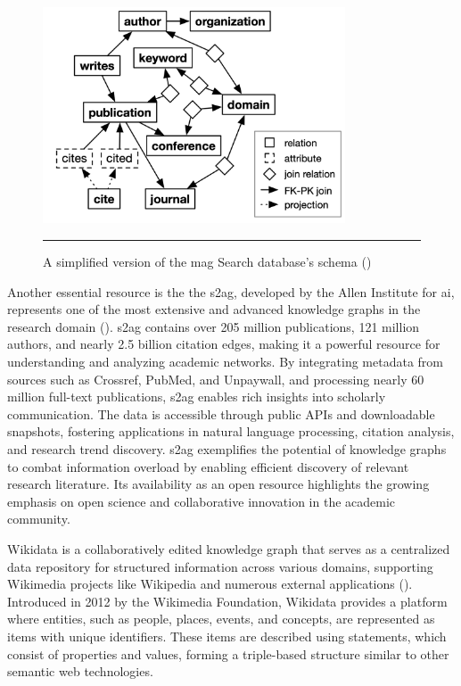 \begin{figure}[htbp]
    \centering
 \includegraphics[width=0.8\textwidth]{03_Figures/literature-review/mag-schema.png}
     \rule{35em}{0.5pt}
    \caption{A simplified version of the \gls{mag} Search database's schema (\cite{Baik2019})} 
 \label{fig:mag-schema}
\end{figure}

Another essential resource is the the \gls{s2ag}, developed by the Allen Institute for \acrlong{ai}, represents one of the most extensive and advanced knowledge graphs in the research domain (\cite{S2AG}).
\gls{s2ag} contains over 205 million publications, 121 million authors, and nearly 2.5 billion citation edges, making it a powerful resource for understanding and analyzing academic networks.
By integrating metadata from sources such as Crossref, PubMed, and Unpaywall, and processing nearly 60 million full-text publications, \gls{s2ag} enables rich insights into scholarly communication.
The data is accessible through public APIs and downloadable snapshots, fostering applications in natural language processing, citation analysis, and research trend discovery.
\gls{s2ag} exemplifies the potential of knowledge graphs to combat information overload by enabling efficient discovery of relevant research literature.
Its availability as an open resource highlights the growing emphasis on open science and collaborative innovation in the academic community.

Wikidata is a collaboratively edited knowledge graph that serves as a centralized data repository for structured information across various domains, supporting Wikimedia projects like Wikipedia and numerous external applications (\cite{Wikidata2014}).
Introduced in 2012 by the Wikimedia Foundation, Wikidata provides a platform where entities, such as people, places, events, and concepts, are represented as items with unique identifiers.
These items are described using statements, which consist of properties and values, forming a triple-based structure similar to other semantic web technologies.

